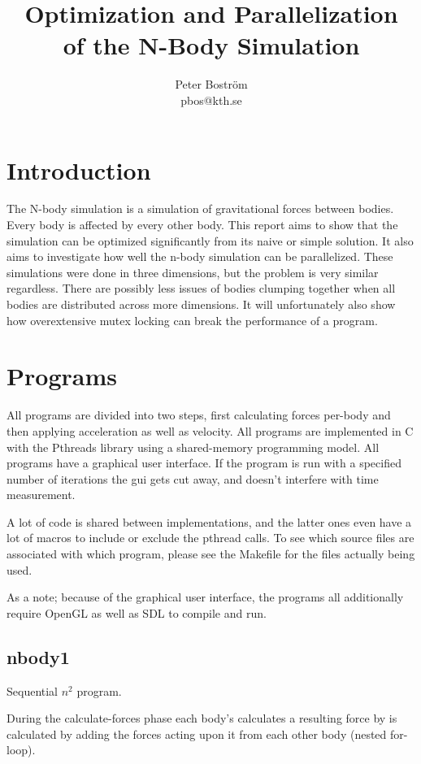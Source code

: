 \documentclass[a4paper] {article}
\title {Optimization and Parallelization \\ of the N-Body Simulation}
\author {Peter Boström \\ pbos@kth.se}
\begin{document}
\maketitle

\tableofcontents
\clearpage

\section{Introduction}

The N-body simulation is a simulation of gravitational forces between bodies. Every body is affected by every other body. This report aims to show that the simulation can be optimized significantly from its naive or simple solution. It also aims to investigate how well the n-body simulation can be parallelized. These simulations were done in three dimensions, but the problem is very similar regardless. There are possibly less issues of bodies clumping together when all bodies are distributed across more dimensions. It will unfortunately also show how overextensive mutex locking can break the performance of a program.

\section{Programs}

All programs are divided into two steps, first calculating forces per-body and then applying acceleration as well as velocity. All programs are implemented in C with the Pthreads library using a shared-memory programming model. All programs have a graphical user interface. If the program is run with a specified number of iterations the gui gets cut away, and doesn't interfere with time measurement.

A lot of code is shared between implementations, and the latter ones even have a lot of macros to include or exclude the pthread calls. To see which source files are associated with which program, please see the Makefile for the files actually being used.

As a note; because of the graphical user interface, the programs all additionally require OpenGL as well as SDL to compile and run.

\subsection{nbody1}

Sequential $n^2$ program.

During the calculate-forces phase each body's calculates a resulting force by is calculated by adding the forces acting upon it from each other body (nested for-loop).
\end{document}
